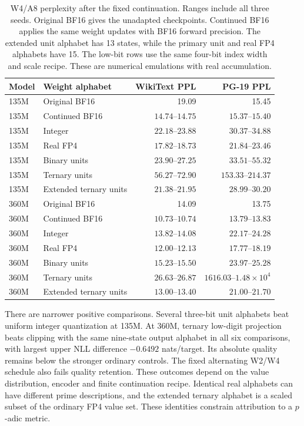 \documentclass[11pt]{article}
\begin{document}
\begin{table}[htbp]
\centering\small
\caption{W4/A8 perplexity after the fixed continuation. Ranges include all three seeds. Original BF16 gives the unadapted checkpoints. Continued BF16 applies the same weight updates with BF16 forward precision. The extended unit alphabet has 13 states, while the primary unit and real FP4 alphabets have 15. The low-bit rows use the same four-bit index width and scale recipe. These are numerical emulations with real accumulation.}
\label{tab:low-precision-central}
\begin{tabular}{llrr}
\toprule
Model & Weight alphabet & WikiText PPL & PG-19 PPL\\
\midrule
135M & Original BF16 & 19.09 & 15.45 \\
135M & Continued BF16 & \(14.74\text{--}14.75\) & \(15.37\text{--}15.40\) \\
135M & Integer & \(22.18\text{--}23.88\) & \(30.37\text{--}34.88\) \\
135M & Real FP4 & \(17.82\text{--}18.73\) & \(21.84\text{--}23.46\) \\
135M & Binary units & \(23.90\text{--}27.25\) & \(33.51\text{--}55.32\) \\
135M & Ternary units & \(56.27\text{--}72.90\) & \(153.33\text{--}214.37\) \\
135M & Extended ternary units & \(21.38\text{--}21.95\) & \(28.99\text{--}30.20\) \\
\midrule
360M & Original BF16 & 14.09 & 13.75 \\
360M & Continued BF16 & \(10.73\text{--}10.74\) & \(13.79\text{--}13.83\) \\
360M & Integer & \(13.82\text{--}14.08\) & \(22.17\text{--}24.28\) \\
360M & Real FP4 & \(12.00\text{--}12.13\) & \(17.77\text{--}18.19\) \\
360M & Binary units & \(15.23\text{--}15.50\) & \(23.97\text{--}25.28\) \\
360M & Ternary units & \(26.63\text{--}26.87\) & \(1616.03\text{--}1.48\times10^{4}\) \\
360M & Extended ternary units & \(13.00\text{--}13.40\) & \(21.00\text{--}21.70\) \\
\bottomrule
\end{tabular}
\end{table}


There are narrower positive comparisons. Several three-bit unit alphabets
beat uniform integer quantization at 135M. At 360M, ternary low-digit
projection beats clipping with the same nine-state output alphabet in
all six comparisons, with largest upper NLL difference \(-0.6492\)
nats/target. Its absolute quality remains below the stronger ordinary
controls. The fixed alternating W2/W4 schedule also fails quality retention.
These outcomes depend on the value distribution, encoder and finite
continuation recipe. Identical real alphabets can have different prime
descriptions, and the extended ternary alphabet is a scaled subset of the
ordinary FP4 value set. These identities constrain attribution to a
\(p\)-adic metric.
\end{document}
